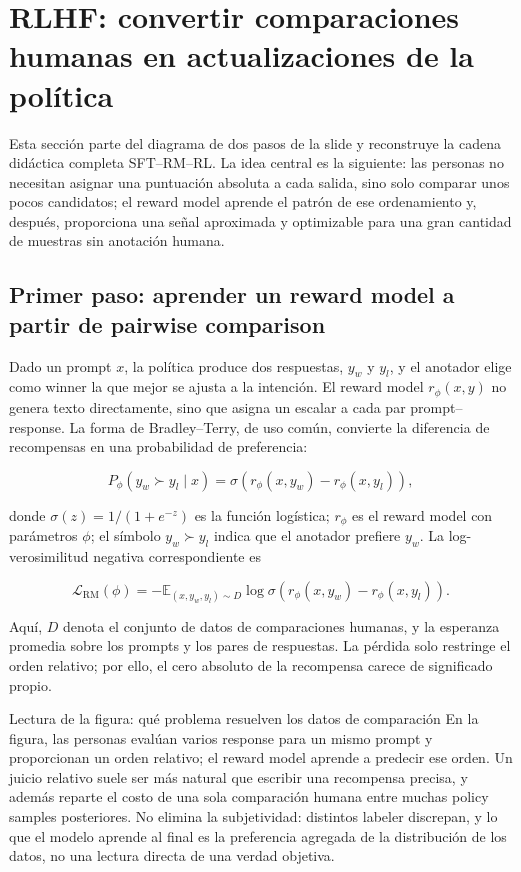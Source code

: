 \section{RLHF: convertir comparaciones humanas en actualizaciones de la política}

Esta sección parte del diagrama de dos pasos de la slide y reconstruye la cadena didáctica completa SFT--RM--RL. La idea central es la siguiente: las personas no necesitan asignar una puntuación absoluta a cada salida, sino solo comparar unos pocos candidatos; el reward model aprende el patrón de ese ordenamiento y, después, proporciona una señal aproximada y optimizable para una gran cantidad de muestras sin anotación humana.

\subsection{Primer paso: aprender un reward model a partir de pairwise comparison}

Dado un prompt $x$, la política produce dos respuestas, $y_w$ y $y_l$, y el anotador elige como winner la que mejor se ajusta a la intención. El reward model $r_\phi(x,y)$ no genera texto directamente, sino que asigna un escalar a cada par prompt--response. La forma de Bradley--Terry, de uso común, convierte la diferencia de recompensas en una probabilidad de preferencia:

\[
P_\phi(y_w \succ y_l\mid x)
=\sigma\!\left(r_\phi(x,y_w)-r_\phi(x,y_l)\right),
\]

donde $\sigma(z)=1/(1+e^{-z})$ es la función logística; $r_\phi$ es el reward model con parámetros $\phi$; el símbolo $y_w \succ y_l$ indica que el anotador prefiere $y_w$. La log-verosimilitud negativa correspondiente es

\[
\mathcal{L}_{\mathrm{RM}}(\phi)
=-\mathbb{E}_{(x,y_w,y_l)\sim D}
\log \sigma\!\left(r_\phi(x,y_w)-r_\phi(x,y_l)\right).
\]

Aquí, $D$ denota el conjunto de datos de comparaciones humanas, y la esperanza promedia sobre los prompts y los pares de respuestas. La pérdida solo restringe el orden relativo; por ello, el cero absoluto de la recompensa carece de significado propio.


\begin{knowledgebox}{Lectura de la figura: qué problema resuelven los datos de comparación}
En la figura, las personas evalúan varios response para un mismo prompt y proporcionan un orden relativo; el reward model aprende a predecir ese orden. Un juicio relativo suele ser más natural que escribir una recompensa precisa, y además reparte el costo de una sola comparación humana entre muchas policy samples posteriores. No elimina la subjetividad: distintos labeler discrepan, y lo que el modelo aprende al final es la preferencia agregada de la distribución de los datos, no una lectura directa de una verdad objetiva.
\end{knowledgebox}

